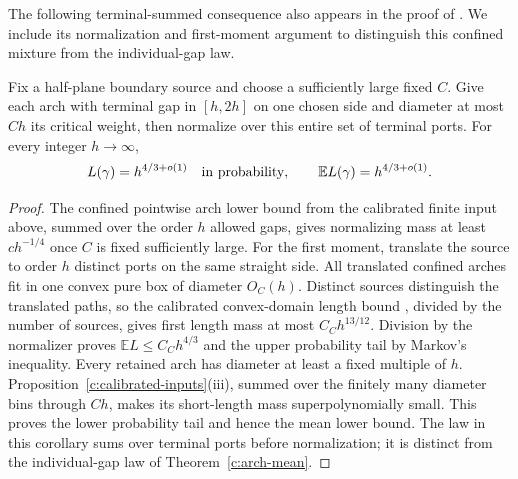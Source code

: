 The following terminal-summed consequence also appears in the proof of
\cite[Theorem~8.1]{Renewal}. We include its normalization and first-moment
argument to distinguish this confined mixture from the individual-gap law.
\begin{corollary}\label{c:confined-arch-mean}
Fix a half-plane boundary source and choose a sufficiently large fixed
$C$. Give each arch with terminal gap in $[h,2h]$ on one chosen side
and diameter at most $Ch$ its critical weight, then normalize over
this entire set of terminal ports. For every integer $h\to\infty$,
\[
 L(\gamma)=h^{4/3+o(1)}\quad\hbox{in probability},\qquad
 \mathbb E L(\gamma)=h^{4/3+o(1)}.
\]
\end{corollary}
\begin{proof}
The confined pointwise arch lower bound from the calibrated finite
input above, summed over the order $h$ allowed gaps,
gives normalizing mass at least $ch^{-1/4}$ once $C$ is fixed sufficiently
large. For the first moment, translate the source to order $h$ distinct
ports on the same straight side. All translated confined arches fit in
one convex pure box of diameter $O_C(h)$. Distinct sources distinguish
the translated paths, so the calibrated convex-domain length bound
\cite[Proposition 11.1]{Calibrated}, divided by the number of sources,
gives first length mass at most $C_C h^{13/12}$. Division by the
normalizer proves $\mathbb E L\le C_C h^{4/3}$ and the upper probability
tail by Markov's inequality. Every retained arch has diameter at least
a fixed multiple of $h$. Proposition~\ref{c:calibrated-inputs}(iii),
summed over the finitely many diameter bins through $Ch$, makes its
short-length mass superpolynomially small. This proves the lower
probability tail and hence the mean lower bound. The law in this
corollary sums over terminal ports before normalization; it is distinct
from the individual-gap law of Theorem~\ref{c:arch-mean}.
\end{proof}
